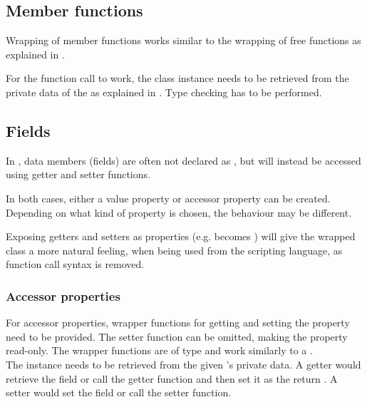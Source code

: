 \subsection{Member functions}

Wrapping of member functions works similar to the wrapping of free functions as explained in .

For the function call to work, the class instance needs to be retrieved from the private data of the   as explained in . Type checking has to be performed.

\subsection{Fields}
\label{sec:Fields}

In , data members (fields) are often not declared as , but will instead be accessed using getter and setter functions.

In both cases, either a  value property or accessor property can be created. Depending on what kind of property is chosen, the behaviour may be different.

Exposing getters and setters as properties (e.g.  becomes ) will give the wrapped class a more natural feeling, when being used from the scripting language, as function call syntax is removed.

\subsubsection{Accessor properties}

For accessor properties, wrapper functions for getting and setting the property need to be provided. The setter function can be omitted, making the property read-only. The wrapper functions are of type  and work similarly to a .\\
The  instance needs to be retrieved from the given 's private data. A getter would retrieve the field or call the  getter function and then set it as the return . A setter would set the field or call the  setter function.

